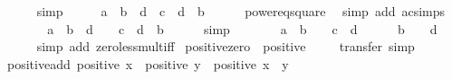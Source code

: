 \begin{isabellebody}
\ \ \ \ \isamarkupfalse%
\ simp\isanewline
\ \ \isamarkupfalse%
\ \isamarkupfalse%
\ {\isachardoublequoteopen}a\ {\isacharasterisk}{\kern0pt}\ b\ {\isacharasterisk}{\kern0pt}\ d\ {\isacharequal}{\kern0pt}\ c\ {\isacharasterisk}{\kern0pt}\ d\ {\isacharasterisk}{\kern0pt}\ b\isanewline
\ \ \ \ \isamarkupfalse%
\ power{}{\isacharunderscore}{\kern0pt}eq{\isacharunderscore}{\kern0pt}square\ \isamarkupfalse%
\ {\isacharparenleft}{\kern0pt}simp\ add{\isacharcolon}{\kern0pt}\ ac{\isacharunderscore}{\kern0pt}simps{\isacharparenright}{\kern0pt}\isanewline
\ \ \isamarkupfalse%
\ \isamarkupfalse%
\ {\isachardoublequoteopen}{}\ {\isacharless}{\kern0pt}\ a\ {\isacharasterisk}{\kern0pt}\ b\ {\isacharasterisk}{\kern0pt}\ d\ {\isasymlongleftrightarrow}\ {}\ {\isacharless}{\kern0pt}\ c\ {\isacharasterisk}{\kern0pt}\ d\ {\isacharasterisk}{\kern0pt}\ b\isanewline
\ \ \ \ \isamarkupfalse%
\ simp\isanewline
\ \ \isamarkupfalse%
\ \isamarkupfalse%
\ {\isachardoublequoteopen}{}\ {\isacharless}{\kern0pt}\ a\ {\isacharasterisk}{\kern0pt}\ b\ {\isasymlongleftrightarrow}\ {}\ {\isacharless}{\kern0pt}\ c\ {\isacharasterisk}{\kern0pt}\ d{\isachardoublequoteclose}\isanewline
\ \ \ \ \isamarkupfalse%
\ {\isacartoucheopen}b\ {\isasymnoteq}\ {}{\isacartoucheclose}\ \ {\isacartoucheopen}d\ {\isasymnoteq}\ {}{\isacartoucheclose}\isanewline
\ \ \ \ \isamarkupfalse%
\ {\isacharparenleft}{\kern0pt}simp\ add{\isacharcolon}{\kern0pt}\ zero{\isacharunderscore}{\kern0pt}less{\isacharunderscore}{\kern0pt}mult{\isacharunderscore}{\kern0pt}iff{\isacharparenright}{\kern0pt}\isanewline
{}\isamarkupfalse%
%
\endisatagproof
{\isafoldproof}%
%
\isadelimproof
\isanewline
%
\endisadelimproof
\isanewline
{}\isamarkupfalse%
\ positive{\isacharunderscore}{\kern0pt}zero{\isacharcolon}{\kern0pt}\ {\isachardoublequoteopen}{\isasymnot}\ positive\ {}{\isachardoublequoteclose}\isanewline
%
\isadelimproof
\ \ %
\endisadelimproof
%
\isatagproof
{}\isamarkupfalse%
\ transfer\ simp%
\endisatagproof
{\isafoldproof}%
%
\isadelimproof
\isanewline
%
\endisadelimproof
\isanewline
{}\isamarkupfalse%
\ positive{\isacharunderscore}{\kern0pt}add{\isacharcolon}{\kern0pt}\ {\isachardoublequoteopen}positive\ x\ {\isasymLongrightarrow}\ positive\ y\ {\isasymLongrightarrow}\ positive\ {\isacharparenleft}{\kern0pt}x\ {\isacharplus}{\kern0pt}\ y{\isacharparenright}{\kern0pt}{\isachardoublequoteclose}\isanewline

\end{isabellebody}
